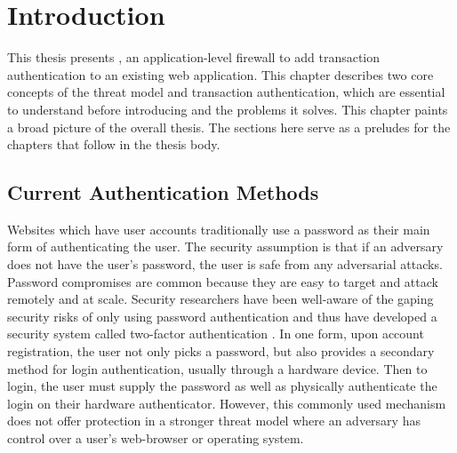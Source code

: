 \chapter{Introduction}

This thesis presents \sys{}, an application-level firewall to add transaction authentication to an existing web application. This chapter describes two core concepts of the threat model and transaction authentication, which are essential to understand before introducing \sys{} and the problems it solves. This chapter paints a broad picture of the overall thesis. The sections here serve as a preludes for the chapters that follow in the thesis body.





\section{Current Authentication Methods}

Websites which have user accounts traditionally use a password as their main form of authenticating the user. The security assumption is that if an adversary does not have the user's password, the user is safe from any adversarial attacks. Password compromises are common \cite{questRemovePasswords} because they are easy to target and attack remotely and at scale. Security researchers have been well-aware of the gaping security risks of only using password authentication and thus have developed a security system called two-factor authentication \cite{2FA}. In one form, upon account registration, the user not only picks a password, but also provides a secondary method for login authentication, usually through a hardware device. Then to login, the user must supply the password as well as physically authenticate the login on their hardware authenticator. However, this commonly used mechanism does not offer protection in a stronger threat model where an adversary has control over a user's web-browser or operating system. 

